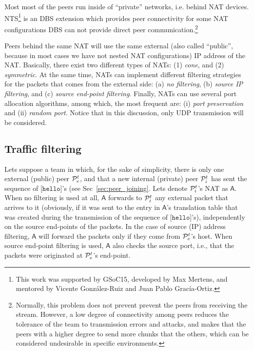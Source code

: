 
Most most of the peers run inside of ``private'' networks, i.e. behind
NAT devices. NTS\footnote{This work was supported by GSoC15, developed
  by Max Mertens, and mentored by Vicente González-Ruiz and Juan Pablo
  Gracía-Ortiz.} is an DBS extension which provides peer connectivity
for some NAT configurations DBS can not provide direct peer
communication.\footnote{Normally, this problem does not prevent
  prevent the peers from receiving the stream. However, a low degree
  of connectivity among peers reduces the tolerance of the team to
  transmission errors and attacks, and makes that the peers with a
  higher degree to send more chunks that the others, which can be
  considered undesirable in specific environments.}

Peers behind the same NAT will use the same external (also called
``public'', because in most cases we have not nested NAT
configurations) IP address of the NAT. Basically, there exist two
different types of NATs: (1) \emph{cone}, and (2) \emph{symmetric}. At
the same time, NATs can implement different filtering strategies for
the packets that comes from the external side: (a) \emph{no
  filtering}, (b) \emph{source IP filtering}, and (c) \emph{source
  end-point filtering}. Finally, NATs can use several port allocation
algorithms, among which, the most frequent are: (i) \emph{port
  preservation} and (ii) \emph{random port}. Notice that in this
discussion, only UDP transmission will be considered.

\subsection{Traffic filtering}
Lets suppose a team in which, for the sake of simplicity, there is
only one external (public) peer ${\cal P}^t_e$, and that a new
internal (private) peer ${\cal P}^t_i$ has sent the sequence of
[$\mathtt{hello}$]'s (see Sec~\ref{sec:peer_joining}. Lets denote
${\cal P}^t_i$'s NAT as $\mathsf{A}$. When no filtering is used at
all, $\mathsf{A}$ forwards to ${\cal P}^t_i$ any external packet that
arrives to it (obviously, if it was sent to the entry in
$\mathsf{A}$'s translation table that was created during the
transmission of the sequence of [$\mathtt{hello}$]'s), independently
on the source end-points of the packets. In the case of source (IP)
address filtering, $\mathsf{A}$ will forward the packets only if they
come from ${\cal P}^t_e$'s host.  When source end-point filtering is
used, $\mathsf{A}$ also checks the source port, i.e., that the packets
were originated at ${\cal P}^t_e$'s end-point.

